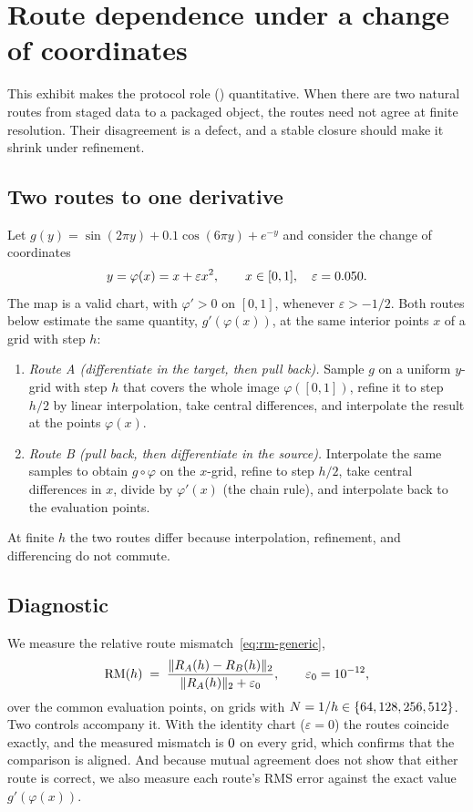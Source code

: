 \section{Route dependence under a change of coordinates}
\label{sec:exhibit-holonomy}

This exhibit makes the protocol role (\Pthree) quantitative.
When there are two natural routes from staged data to a packaged object, the routes need not agree at finite resolution.
Their disagreement is a defect, and a stable closure should make it shrink under refinement.

\subsection{Two routes to one derivative}
Let $g(y)=\sin(2\pi y)+0.1\cos(6\pi y)+e^{-y}$ and consider the change of coordinates
\[
  y=\varphi(x)=x+\varepsilon x^2,\qquad x\in[0,1],\quad\varepsilon=0.050 .
\]
The map is a valid chart, with $\varphi'>0$ on $[0,1]$, whenever $\varepsilon>-1/2$.
Both routes below estimate the same quantity, $g'(\varphi(x))$, at the same interior points $x$ of a grid with step $h$:
\begin{enumerate}
  \item \emph{Route A (differentiate in the target, then pull back).} Sample $g$ on a uniform $y$-grid with step $h$ that covers the whole image $\varphi([0,1])$, refine it to step $h/2$ by linear interpolation, take central differences, and interpolate the result at the points $\varphi(x)$.
  \item \emph{Route B (pull back, then differentiate in the source).} Interpolate the same samples to obtain $g\circ\varphi$ on the $x$-grid, refine to step $h/2$, take central differences in $x$, divide by $\varphi'(x)$ (the chain rule), and interpolate back to the evaluation points.
\end{enumerate}
At finite $h$ the two routes differ because interpolation, refinement, and differencing do not commute.

\subsection{Diagnostic}
We measure the relative route mismatch~\eqref{eq:rm-generic},
\begin{equation}\label{eq:rm-def}
  \mathrm{RM}(h)\;=\;\frac{\|R_A(h)-R_B(h)\|_2}{\|R_A(h)\|_2+\varepsilon_0},\qquad \varepsilon_0=10^{-12},
\end{equation}
over the common evaluation points, on grids with $N=1/h\in\{64,128,256,512\}$.
Two controls accompany it.
With the identity chart ($\varepsilon=0$) the routes coincide exactly, and the measured mismatch is $0$ on every grid, which confirms that the comparison is aligned.
And because mutual agreement does not show that either route is correct, we also measure each route's RMS error against the exact value $g'(\varphi(x))$.

